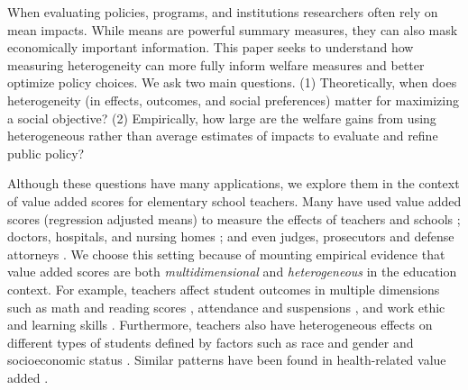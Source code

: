 \documentclass[12pt]{article}
\theoremstyle{definition}
\theoremstyle{definition}
\theoremstyle{definition}
\theoremstyle{definition}
\begin{document}
When evaluating policies, programs, and institutions researchers often rely on mean impacts. While means are powerful summary measures, they can also mask economically important information. This paper seeks to understand how measuring heterogeneity can more fully inform welfare measures and better optimize policy choices. We ask two main questions. (1) Theoretically, when does heterogeneity (in effects, outcomes, and social preferences) matter for maximizing a social objective? (2) Empirically, how large are the welfare gains from using heterogeneous rather than average estimates of impacts to evaluate and refine public policy?


Although these questions have many applications, we explore them in the context of value added scores for elementary school teachers. Many have used value added scores (regression adjusted means) to measure the effects of teachers and schools \citep[see reviews in][]{angrist2022methods,bacher2022estimation}; doctors, hospitals, and nursing homes \citep{chandra2016health,doyle2019evaluating,hull2020hosptial,einav2022producing,chan2022selection}; and even judges, prosecutors and defense attorneys \citep{abrams2007luck,norris2019examiner,harrington2023prosecutor}. We choose this setting because of mounting empirical evidence that value added scores are both \textit{multidimensional} and \textit{heterogeneous} in the education context. For example, teachers affect student outcomes in multiple dimensions such as math and reading scores \citep{condie2014teacher}, attendance and suspensions \citep{jackson2018test}, and work ethic and learning skills \citep{pope2017multidimensional}. Furthermore, teachers also have heterogeneous effects on different types of students defined by factors such as race and gender \citep[e.g.,][]{dee2005teacher,delhommer2019highschool,Delgado2020} and socioeconomic status \citep{bates2022teacher}. Similar patterns have been found in health-related value added \citep[e.g.,][]{hull2020hosptial,amyspaperwhenitcomesout}. 
\end{document}
